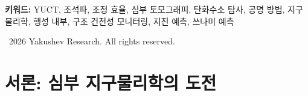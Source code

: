 \documentclass[12pt,a4paper]{article}
\theoremstyle{remark}
\newcommand{\Keff}{K_{\mathrm{eff}}}
\newcommand{\kappac}{\kappa_c}
\newcommand{\eps}{\varepsilon}
\begin{document}
\begin{titlepage}
\begin{center}
			\begin{minipage}{0.9\textwidth}
				\begin{abstract}
					\noindent
					본 부록은 달과 태양에 의한 조석 중력 강제력에 대한 지각의 공명 응답 분석에 기초한 새로운 수동적 지구물리 탐사 방법을 도입한다. 야쿠셰프 통합 조정 이론(Yakushev Unified Coordination Theory, YUCT)의 틀 안에서, 조석 변형의 스펙트럼이 암석 유형, 유체 함량(석유, 가스, 물) 및 광체와 직접적으로 관련된 조정 효율 \(\Keff\)의 지하 분포에 관한 정보를 포함함을 보인다. 우리는 보편적 오차 스케일링 법칙 \(\eps = \kappac \alpha \Keff^{-\beta}\) (\(\beta=0.67\), \(\kappac=0.33\))과 YUCT 섹터 0(중력) 및 섹터 34(행성 과학)로부터의 중력장과 탄성 변형 사이의 결합 방정식을 활용하여, 지표 중력 측정 및 지진 측정을 \(\Keff\)의 깊이 분포에 연결하는 수학적 모델을 개발한다. 조석파가 능동적 음원으로는 도달할 수 없는 투과 깊이를 가지며, 저렴하고 환경 친화적이며 전 지구적으로 적용 가능한 탐사 방법을 제공함을 보인다. 조석 공명의 직접 관측 및 중력 조석을 이용한 탄화수소 탐사 제안 등, 본 접근법의 요소들을 선취하는 독립적인 연구들을 조사한다. 원소 주기율표와 유사한 조정 기반 광물 및 유체 분류 체계에 기초하여, 특징적인 공명 주파수와 품질 계수를 통해 탄화수소를 식별하는 방법론을 제안한다. 경제적 타당성을 평가한다: 건성공 시추 위험의 20–30%
				\end{abstract}
			\end{minipage}
			
			\vspace{1cm}
			
			\noindent
			\small\textbf{키워드:} YUCT, 조석파, 조정 효율, 심부 토모그래피, 탄화수소 탐사, 공명 방법, 지구물리학, 행성 내부, 구조 건전성 모니터링, 지진 예측, 쓰나미 예측
			
			\vspace{0.5cm}
			
			\noindent
			\textcopyright\ 2026 Yakushev Research. All rights reserved.
		\end{center}
	\end{titlepage}
	
	\tableofcontents
	\newpage
	
	\section{서론: 심부 지구물리학의 도전}
	\label{sec:intro}
	
\end{document}
